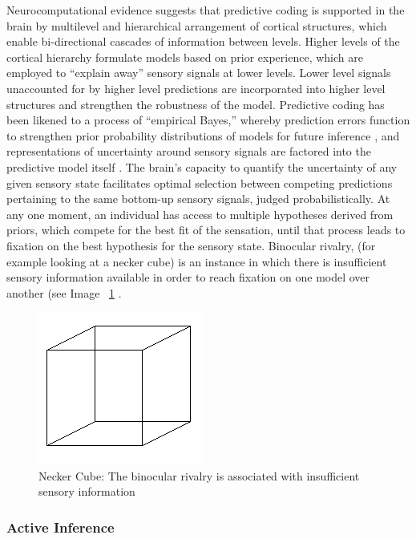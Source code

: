 \begin{CJK}{UTF8}{gbsn}
Neurocomputational evidence suggests that predictive coding is supported in the brain by multilevel and hierarchical arrangement of cortical structures, which enable bi-directional cascades of information between levels.  Higher levels of the cortical hierarchy formulate models based on prior experience, which are employed to ``explain away'' sensory signals at lower levels. Lower level signals unaccounted for by higher level predictions are incorporated into higher level structures and strengthen the robustness of the model.  Predictive coding has been likened to a process of ``empirical Bayes,'' whereby prediction errors function to strengthen prior probability distributions of models for future inference \citep{Robbins1964}, and representations of uncertainty around sensory signals are factored into the predictive model itself \citep{Clark2013}.  The brain's capacity to quantify the uncertainty of any given sensory state facilitates optimal selection between competing predictions pertaining to the same bottom-up sensory signals, judged probabilistically.  At any one moment, an individual has access to multiple hypotheses derived from priors, which compete for the best fit of the sensation, until that process leads to fixation on the best hypothesis for the sensory state.
Binocular rivalry, (for example looking at a necker cube) is an instance in which there is insufficient sensory information available in order to reach fixation on one model over another (see Image ~\ref{fig:neckerCube} \citep{Frith2007}.

\begin{figure}[htbp]
  \begin{center}
    \includegraphics[scale=.7]{images/Necker_cube.png}
      \caption{Necker Cube: The binocular rivalry is associated with insufficient sensory information}
        \label{fig:neckerCube}
   \end{center}
\end{figure}


\subsubsection{Active Inference}


\end{CJK}
